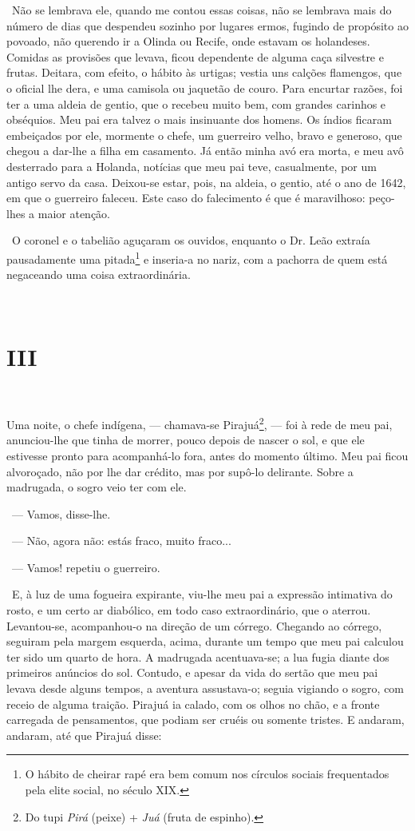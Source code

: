 ~Não se lembrava ele, quando me contou essas coisas, não se lembrava
mais do número de dias que despendeu sozinho por lugares ermos, fugindo
de propósito ao povoado, não querendo ir a Olinda ou Recife, onde
estavam os holandeses. Comidas as provisões que levava, ficou dependente
de alguma caça silvestre e frutas. Deitara, com efeito, o hábito às
urtigas; vestia uns calções flamengos, que o oficial lhe dera, e uma
camisola ou jaquetão de couro. Para encurtar razões, foi ter a uma
aldeia de gentio, que o recebeu muito bem, com grandes carinhos e
obséquios. Meu pai era talvez o mais insinuante dos homens. Os índios
ficaram embeiçados por ele, mormente o chefe, um guerreiro velho, bravo
e generoso, que chegou a dar-lhe a filha em casamento. Já então minha
avó era morta, e meu avô desterrado para a Holanda, notícias que meu pai
teve, casualmente, por um antigo servo da casa. Deixou-se estar, pois,
na aldeia, o gentio, até o ano de 1642, em que o guerreiro faleceu. Este
caso do falecimento é que é maravilhoso: peço-lhes a maior atenção.

~O coronel e o tabelião aguçaram os ouvidos, enquanto o Dr. Leão extraía
pausadamente uma pitada\footnote{O hábito de cheirar rapé era bem comum
  nos círculos sociais frequentados pela elite social, no século XIX.} e
inseria-a no nariz, com a pachorra de quem está negaceando uma coisa
extraordinária.

~~

\section{III}

~

Uma noite, o chefe indígena, --- chamava-se Pirajuá\footnote{Do tupi
  \emph{Pirá} (peixe) + \emph{Juá} (fruta de espinho).}, --- foi à rede
de meu pai, anunciou-lhe que tinha de morrer, pouco depois de nascer o
sol, e que ele estivesse pronto para acompanhá-lo fora, antes do momento
último. Meu pai ficou alvoroçado, não por lhe dar crédito, mas por
supô-lo delirante. Sobre a madrugada, o sogro veio ter com ele.

~--- Vamos, disse-lhe.

~--- Não, agora não: estás fraco, muito fraco...

~--- Vamos! repetiu o guerreiro.

~E, à luz de uma fogueira expirante, viu-lhe meu pai a expressão
intimativa do rosto, e um certo ar diabólico, em todo caso
extraordinário, que o aterrou. Levantou-se, acompanhou-o na direção de
um córrego. Chegando ao córrego, seguiram pela margem esquerda, acima,
durante um tempo que meu pai calculou ter sido um quarto de hora. A
madrugada acentuava-se; a lua fugia diante dos primeiros anúncios do
sol. Contudo, e apesar da vida do sertão que meu pai levava desde alguns
tempos, a aventura assustava-o; seguia vigiando o sogro, com receio de
alguma traição. Pirajuá ia calado, com os olhos no chão, e a fronte
carregada de pensamentos, que podiam ser cruéis ou somente tristes. E
andaram, andaram, até que Pirajuá disse:

